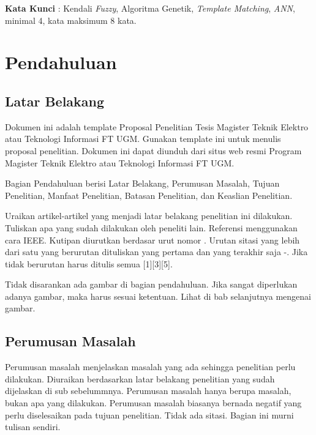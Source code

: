 \documentclass[12pt]{article}
\begin{document}
\textbf{Kata Kunci} : Kendali \textit{Fuzzy}, Algoritma Genetik, \textit{Template Matching}, \textit{ANN}, minimal 4, kata maksimum 8 kata.
\pagebreak{}

\section{Pendahuluan}

\subsection{Latar Belakang}

Dokumen ini adalah template Proposal Penelitian Tesis Magister Teknik Elektro atau Teknologi Informasi FT UGM. Gunakan template ini untuk menulis proposal penelitian. Dokumen ini dapat diunduh dari situs web resmi Program Magister Teknik Elektro atau Teknologi Informasi FT UGM. 

Bagian Pendahuluan berisi Latar Belakang, Perumusan Masalah, Tujuan Penelitian, Manfaat Penelitian, Batasan Penelitian, dan Keaslian Penelitian.

Uraikan artikel-artikel yang menjadi latar belakang penelitian ini dilakukan. Tuliskan apa yang sudah dilakukan oleh peneliti lain. Referensi menggunakan cara IEEE. Kutipan diurutkan berdasar urut nomor \cite{metev1998}\cite{Breckling1989}. Urutan sitasi yang lebih dari satu yang berurutan dituliskan yang pertama dan yang terakhir saja \cite{metev1998}-\cite{Padhye1999}. Jika tidak berurutan harus ditulis semua [1][3][5].

Tidak disarankan ada gambar di bagian pendahuluan. Jika sangat diperlukan adanya gambar, maka harus sesuai ketentuan. Lihat di bab selanjutnya mengenai gambar.


\subsection{Perumusan Masalah}

Perumusan masalah menjelaskan masalah yang ada sehingga penelitian perlu dilakukan. Diuraikan berdasarkan latar belakang penelitian yang sudah dijelaskan di sub sebelummnya. Perumusan masalah hanya berupa masalah, bukan apa yang dilakukan. Perumusan masalah biasanya bernada negatif yang perlu diselesaikan pada tujuan penelitian. Tidak ada sitasi. Bagian ini murni tulisan sendiri. 
\end{document}
